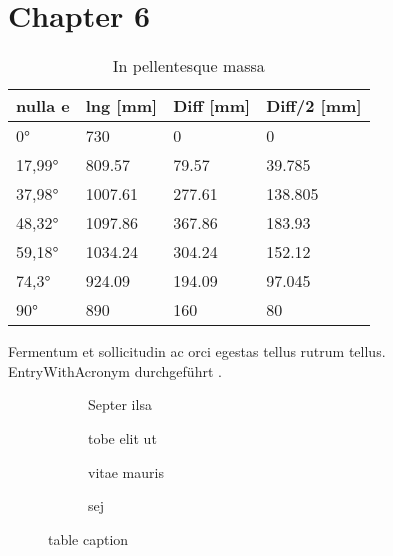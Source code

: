 \documentclass[../main.tex]{subfiles}
\begin{document}
\section{Chapter 6}
\lipsum[5]

\begin{table}[H]
	\centering
	\begin{tabular}{llll}
		\toprule
		\textbf{nulla e} & \textbf{lng [mm]} & \textbf{Diff [mm]} & \textbf{Diff/2 [mm]} \\
		\midrule\morecmidrules\midrule
		\ang{0}          & 730               & 0                  & 0                    \\
		\midrule
		\ang{17,99}      & \num{809,57}      & \num{79,57}        & \num{39,785}         \\
		\ang{37,98}      & \num{1007,61}     & \num{277,61}       & \num{138,805}        \\
		\ang{48,32}      & \num{1097,86}     & \num{367,86}       & \num{183,93}         \\
		\ang{59,18}      & \num{1034,24}     & \num{304,24}       & \num{152,12}         \\
		\ang{74,3}       & \num{924,09}      & \num{194,09}       & \num{97,045}         \\
		\ang{90}         & \num{890}         & \num{160}          & \num{80}             \\
		\bottomrule
	\end{tabular}
	\caption{In pellentesque massa}
	\label{tab:tablelabeldqwfinweopv}
\end{table}

\pagebreak

Fermentum et sollicitudin ac orci  egestas tellus  rutrum tellus. \gls{EntryWithAcronym} durchgeführt .
\begin{figure}[H]
	\centering
	
	\begin{subfigure}[c]{0.49\linewidth}
		\caption{Septer ilsa}
		\label{fig:subfigureexample1}
	\end{subfigure}\hfill
	\begin{subfigure}[c]{0.49\linewidth}
		\caption{tobe elit ut}
		\label{fig:subfigureexample2}
	\end{subfigure}\par\medskip
	\begin{subfigure}[c]{0.49\linewidth}
		\caption{vitae mauris}
		\label{fig:subfigureexample3}
	\end{subfigure}\hfill
	\begin{subfigure}[c]{0.49\linewidth}
		\caption{sej}
		\label{fig:subfigureexample4}
	\end{subfigure}
	
	\caption{table caption}
	\label{fig:subfigureexample}
\end{figure}

\end{document}
